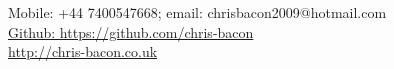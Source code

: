 \begin{center}
	Mobile: +44 7400547668; email: chrisbacon2009@hotmail.com\\
	\href{https://github.com/chris-bacon}{Github: https://github.com/chris-bacon}\\
	\href{http://chris-bacon.co.uk}{http://chris-bacon.co.uk}
	
\end{center}